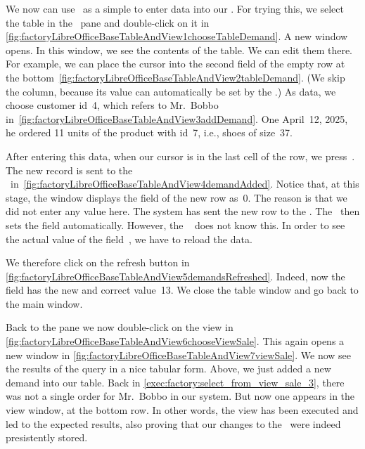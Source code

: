 %
We now can use \libreofficeBase\ as a simple  to enter data into our \db.
For trying this, we select the table  in the ~pane and double-click on it in \cref{fig:factoryLibreOfficeBaseTableAndView1chooseTableDemand}.
A new window opens.
In this window, we see the contents of the table.
We can edit them there.
For example, we can place the cursor into the second field of the empty row at the bottom~\cref{fig:factoryLibreOfficeBaseTableAndView2tableDemand}.
(We skip the  column, because its value can automatically be set by the \dbms.)
As data, we choose customer id~4, which refers to Mr.~Bobbo in~\cref{fig:factoryLibreOfficeBaseTableAndView3addDemand}.
One April~12, 2025, he ordered 11 units of the product with id~7, i.e., shoes of size~37.

After entering this data, when our cursor is in the last cell of the row, we press~\keys{\tab}.
The new record is sent to the \dbms\ in~\cref{fig:factoryLibreOfficeBaseTableAndView4demandAdded}.
Notice that, at this stage, the window displays the  field of the new row as~0.
The reason is that we did not enter any value here.
The system has sent the new row to the \dbms.
The \dbms\ then sets the  field automatically.
However, the \libreofficeBase\  does not know this.
In order to see the actual value of the field~, we have to reload the data.

We therefore click on the refresh button in \cref{fig:factoryLibreOfficeBaseTableAndView5demandsRefreshed}.
Indeed, now the  field has the new and correct value~13.
We close the table window and go back to the main window.

Back to the  pane we now double-click on the view  in \cref{fig:factoryLibreOfficeBaseTableAndView6chooseViewSale}.
This again opens a new window in \cref{fig:factoryLibreOfficeBaseTableAndView7viewSale}.
We now see the results of the query in a nice tabular form.
Above, we just added a new demand into our table.
Back in \cref{exec:factory:select_from_view_sale_3}, there was not a single order for Mr.~Bobbo in our system.
But now one appears in the view window, at the bottom row.
In other words, the view has been executed and led to the expected results, also proving that our changes to the \db\ were indeed presistently stored.%
%
\FloatBarrier%
\endhsection%
%
